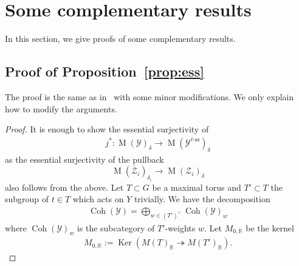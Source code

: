 \documentclass [11pt,oneside,a4paper,mathscr]{amsart}
\theoremstyle{definition}
\newcommand{\Y}{\mathcal{Y}}
\newcommand{\MM}{\operatorname{M}}
\newcommand{\Coh}{\operatorname{Coh}}
\newcommand{\Ker}{\operatorname{Ker}}
\begin{document}
\section{Some complementary results}
In this section, we give proofs of some complementary results. 

\subsection{Proof of Proposition~\ref{prop:ess}}\label{subsec:essurj}
The proof is the same as in~\cite[Proposition~3.22]{PTquiver} with some 
minor modifications. We only explain how to modify the arguments. 

\begin{proof}
It is enough to show the essential surjectivity of 
\begin{align*}
    j^* \colon \MM(\Y)_{\delta} \to \MM(\Y^{\ell\text{-ss}})_{\delta}
\end{align*}
as the essential surjectivity of the pullback \[\MM(\overline{\mathcal{Z}}_i)_{\delta_i} \to 
\MM(\mathcal{Z}_i)_{\delta}\] also follows from the above. 
Let $T \subset G$ be a maximal torus and $T' \subset T$ the 
subgroup of $t\in T$ which acts on $Y$ trivially. We have the 
decomposition 
\begin{align*}
    \Coh(\Y)=\bigoplus_{w \in (T')^{\vee}}\Coh(\Y)_{w}
\end{align*}
where $\Coh(\Y)_{w}$ is the subcategory of $T'$-weights $w$. 
Let $M_{0, \mathbb{R}}$ be the kernel 
\begin{align*}
    M_{0, \mathbb{R}}:=\Ker(M(T)_{\mathbb{R}} \twoheadrightarrow M(T')_{\mathbb{R}}).
\end{align*}


\end{proof}
\end{document}
